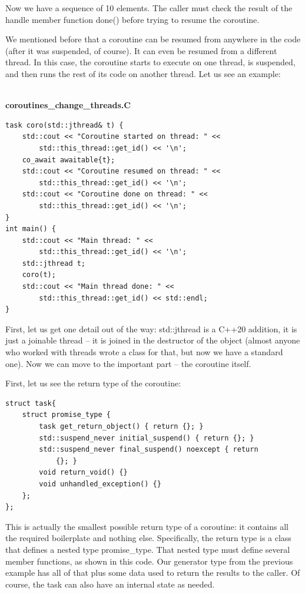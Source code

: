 Now we have a sequence of 10 elements. The caller must check the result of the handle member function done() before trying to resume the coroutine.

We mentioned before that a coroutine can be resumed from anywhere in the code (after it was suspended, of course). It can even be resumed from a different thread. In this case, the coroutine starts to execute on one thread, is suspended, and then runs the rest of its code on another thread. Let us see an example:

\hspace*{\fill} \\ %
\noindent
\textbf{coroutines\_change\_threads.C}
\begin{lstlisting}[style=styleCXX]
task coro(std::jthread& t) {
	std::cout << "Coroutine started on thread: " <<
		std::this_thread::get_id() << '\n';
	co_await awaitable{t};
    std::cout << "Coroutine resumed on thread: " <<
		std::this_thread::get_id() << '\n';
	std::cout << "Coroutine done on thread: " <<
		std::this_thread::get_id() << '\n';
}
int main() {
	std::cout << "Main thread: " <<
		std::this_thread::get_id() << '\n';
	std::jthread t;
	coro(t);
	std::cout << "Main thread done: " << 
		std::this_thread::get_id() << std::endl;
}
\end{lstlisting}

First, let us get one detail out of the way: std::jthread is a C++20 addition, it is just a joinable thread – it is joined in the destructor of the object (almost anyone who worked with threads wrote a class for that, but now we have a standard one). Now we can move to the important part – the coroutine itself. 

First, let us see the return type of the coroutine:

\begin{lstlisting}[style=styleCXX]
struct task{
	struct promise_type {
		task get_return_object() { return {}; }
		std::suspend_never initial_suspend() { return {}; }
		std::suspend_never final_suspend() noexcept { return 
			{}; }
		void return_void() {}
		void unhandled_exception() {}
	};
};
\end{lstlisting}

This is actually the smallest possible return type of a coroutine: it contains all the required boilerplate and nothing else. Specifically, the return type is a class that defines a nested type promise\_type. That nested type must define several member functions, as shown in this code. Our generator type from the previous example has all of that plus some data used to return the results to the caller. Of course, the task can also have an internal state as needed.

